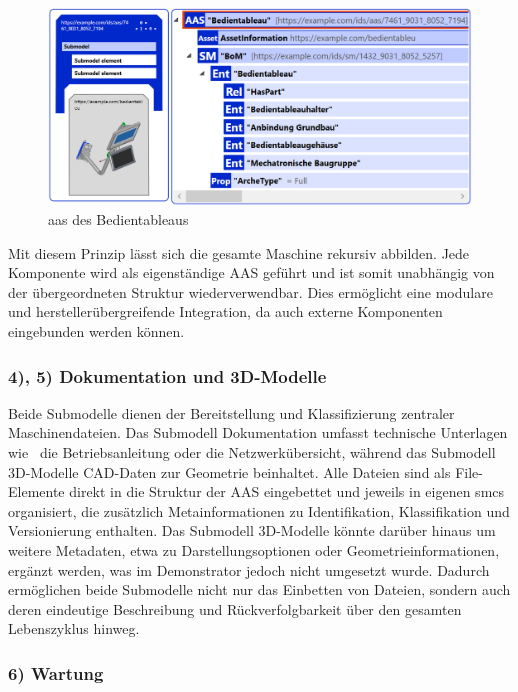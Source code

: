\begin{figure}[htbp]
    \centering
        \includegraphics[width=1\textwidth]{Bilder/ErgebnissePackageExplorer/BedientableauTest.PNG}
    \caption{\acs{aas} des Bedientableaus}
    \label{fig:AASBedientableau}
\end{figure}


Mit diesem Prinzip lässt sich die gesamte Maschine rekursiv abbilden. 
Jede Komponente wird als eigenständige AAS geführt und ist somit unabhängig von der übergeordneten Struktur wiederverwendbar. 
Dies ermöglicht eine modulare und herstellerübergreifende Integration, da auch externe Komponenten eingebunden werden können.

\subsubsection*{4), 5) Dokumentation und 3D-Modelle}
\vspace{-0.5em}

Beide Submodelle dienen der Bereitstellung und Klassifizierung zentraler Maschinendateien. 
Das Submodell Dokumentation umfasst technische Unterlagen wie%
\pagebreak
~die Betriebsanleitung oder die Netzwerkübersicht, während das Submodell 3D-Modelle CAD-Daten zur Geometrie beinhaltet. 
Alle Dateien sind als File-Elemente direkt in die Struktur der AAS eingebettet und jeweils in eigenen \acsp{smc} organisiert, die zusätzlich Metainformationen zu Identifikation, Klassifikation und Versionierung enthalten. 
Das Submodell 3D-Modelle könnte darüber hinaus um weitere Metadaten, etwa zu Darstellungsoptionen oder Geometrieinformationen, ergänzt werden, was im Demonstrator jedoch nicht umgesetzt wurde. 
Dadurch ermöglichen beide Submodelle nicht nur das Einbetten von Dateien, sondern auch deren eindeutige Beschreibung und Rückverfolgbarkeit über den gesamten Lebenszyklus hinweg.

\subsubsection*{6) Wartung}
\vspace{-0.5em}

